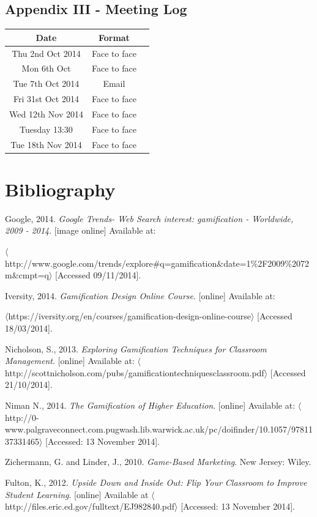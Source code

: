\documentclass[10pt,a4paper]{report}
\begin{document}
\subsection*{Appendix III - Meeting Log}
\begin{tabular}{|c|c|c|}
	\hline Date & Format \\ 
	\hline Thu 2nd Oct 2014 & Face to face \\ 
	\hline Mon 6th Oct & Face to face \\
	\hline Tue 7th Oct 2014 & Email \\ 
	\hline Fri 31st Oct 2014 & Face to face \\ 
	\hline Wed 12th Nov 2014 & Face to face \\
	\hline Tuesday 13:30 & Face to face \\ 
	\hline Tue 18th Nov 2014 & Face to face \\ 
	\hline 
	\end{tabular} 

\section*{Bibliography}
Google, 2014. \textit{Google Trends- Web Search interest: gamification - Worldwide, 2009 - 2014}. [image online] Available at: 

\noindent $\langle$http://www.google.com/trends/explore\#q=gamification\&date=1\%2F2009\%2072m\&cmpt=q$\rangle$ [Accessed 09/11/2014].
\newline

\noindent Iversity, 2014. \textit{Gamification Design Online Course}. [online] Available at: 

\noindent $\langle$https://iversity.org/en/courses/gamification-design-online-course$\rangle$ [Accessed 18/03/2014].
\newline

\noindent Nicholson, S., 2013. \textit{Exploring Gamification Techniques for Classroom Management}. [online] Available at: $\langle$http://scottnicholson.com/pubs/gamificationtechniquesclassroom.pdf$\rangle$ [Accessed 21/10/2014].
\newline

\noindent Niman N., 2014. \textit{The Gamification of Higher Education}. [online] Available at: $\langle$http://0-www.palgraveconnect.com.pugwash.lib.warwick.ac.uk/pc/doifinder/10.1057/9781137331465$\rangle$ [Accessed: 13 November 2014].
\newline

\noindent Zichermann, G. and Linder, J., 2010. \textit{Game-Based Marketing}. New Jersey: Wiley.
\newline

\noindent Fulton, K., 2012. \textit{Upside Down and Inside Out: Flip Your Classroom to Improve Student Learning}. [online] Available at $\langle$http://files.eric.ed.gov/fulltext/EJ982840.pdf$\rangle$ [Accessed: 13 November 2014].
\end{document}
